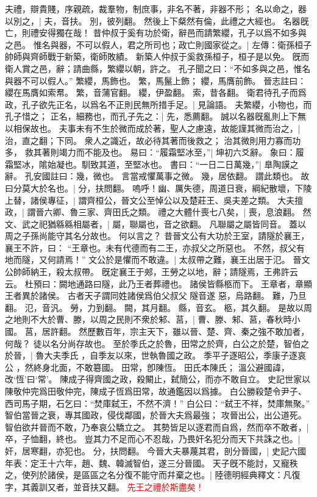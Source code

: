 夫禮，辯貴賤，序親疏，裁羣物，制庶事，非名不著，非器不形；
名以命之，器以別之，|{
	夫，音扶。
	別，彼列翻。
	}
然後上下粲然有倫，此禮之大經也。
名器旣亡，則禮安得獨在哉！
昔仲叔于奚有功於衛，辭邑而請繁纓，孔子以爲不如多與之邑。
惟名與器，不可以假人，君之所司也；政亡則國家從之。|{
	左傳：衛孫桓子帥師與齊師戰于新築，衛師敗績。
	新築人仲叔于奚救孫桓子，桓子是以免。
	旣而衛人賞之邑，辭；請曲縣，繁纓以朝，許之。
	孔子聞之曰：“不如多與之邑，惟名與器不可以假人。”
	繁纓，馬飾也。
	繁，馬鬣上飾；
	纓，馬膺前飾。
	晉志註曰：纓在馬膺如索帬。
	繁，音蒲官翻。
	纓，伊盈翻。
	索，昔各翻。
	}
衛君待孔子而爲政，孔子欲先正名，以爲名不正則民無所措手足。|{
	見論語。
	}
夫繁纓，小物也，而孔子惜之；
正名，細務也，而孔子先之：|{
	先，悉薦翻。
	}
誠以名器旣亂則上下無以相保故也。
夫事未有不生於微而成於著，聖人之慮遠，故能謹其微而治之，|{
	治，直之翻；下同。
	}
衆人之識近，故必待其著而後救之；
治其微則用力寡而功多，
救其著則竭力而不能及也。
易曰：“履霜堅冰至，”|{
	坤初六爻辭。
	象曰：履霜堅冰，隂始凝也。馴致其道，至堅冰也。
	}
書曰：“一日二日萬幾，”|{
	臯陶謨之辭。
	孔安國註曰：幾，微也。
	言當戒懼萬事之微。
	幾，居依翻。}
謂此類也。
故曰分莫大於名也。|{
	分，扶問翻。
	}
嗚呼！幽、厲失德，周道日衰，綱紀散壞，下陵上替，諸侯專征，|{
	謂齊桓公，晉文公至悼公以及楚莊王、吳夫差之類。
	}
大夫擅政，|{
	謂晉六卿、魯三家、齊田氏之類。
	}
禮之大體什喪七八矣，|{
	喪，息浪翻。
	}
然文、武之祀猶緜緜相屬者，|{
	屬，聯屬也，音之欲翻。
	凡聯屬之屬皆同音。
	}
蓋以周之子孫尚能守其名分故也。
何以言之？
昔晉文公有大功於王室，請隧於襄王，襄王不許，曰：
	“王章也。未有代德而有二王，亦叔父之所惡也。
	不然，叔父有地而隧，又何請焉！”
文公於是懼而不敢違。|{
	太叔帶之難，襄王出居于氾。
	晉文公帥師納王，殺太叔帶。
	旣定襄王于郟，王勞之以地，辭；請隧焉，王弗許云云。
	杜預曰：闕地通路曰隧，此乃王者葬禮也。
	諸侯皆縣柩而下。
	王章者，章顯王者異於諸侯。
	古者天子謂同姓諸侯爲伯父叔父
	隧音遂
	惡，烏路翻。
	難，乃旦翻。
	氾，音汎。
	勞，力到翻。
	闕，其月翻。
	縣，音玄。
	柩，其久翻。
	}
是故以周之地則不大於曹、滕，以周之民則不衆於邾、莒，|{
	曹、滕、邾、莒，春秋時小國。
	莒，居許翻。
	}
然歷數百年，宗主天下，雖以晉、楚、齊、秦之強不敢加者，何哉？
徒以名分尚存故也。
至於季氏之於魯，田常之於齊，白公之於楚，智伯之於晉，|{
	魯大夫季氏 ，自季友以來，世執魯國之政。
	季平子逐昭公，季康子逐哀公 ，然終身北面，不敢簒國。
	田常，卽陳恆。
	田氏本陳氏；
	溫公避國諱，改`恆'曰`常'。
	陳成子得齊國之政，殺闞止，弑簡公，而亦不敢自立。
	史記世家以陳敬仲完爲田敬仲完，陳成子恆爲田常，故通鑑因以爲據。
	白公勝殺楚令尹子、西司馬子期，石乞曰：“焚庫弑王，不然不濟！”
	白公曰：“弑王不祥，焚庫無聚。”
	智伯當晉之衰，專其國政，侵伐鄰國，於晉大夫爲最強；
	攻晉出公，出公道死。
	智伯欲幷晉而不敢，乃奉哀公驕立之。
	}
其勢皆足以逐君而自爲，然而卒不敢者，|{
	卒，子恤翻，終也。
	}
豈其力不足而心不忍哉，乃畏奸名犯分而天下共誅之也。|{
	奸，居寒翻，亦犯也。
	分，扶問翻。}
今晉大夫暴蔑其君，剖分晉國，|{
	史記六國年表：定王十六年，趙、魏、韓滅智伯，遂三分晉國。
	}
天子旣不能討，又寵秩之，使列於諸侯，是區區之名分復不能守而幷棄之也。|{
	陸德明經典釋文：凡復字，其義訓又者，並音扶又翻。
	}
\textcolor{red}{先王之禮於斯盡矣！}

